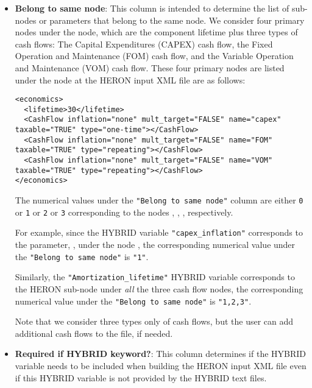 \begin{itemize}
    \item \textbf{Belong to same node}: This column is intended to determine the list of sub-nodes or parameters that belong to the same node. We consider four primary nodes under the  node, which are the component lifetime plus three types of cash flows: The Capital Expenditures (CAPEX) cash flow, the Fixed Operation and Maintenance (FOM) cash flow, and the Variable Operation and Maintenance (VOM) cash flow. These four primary nodes are listed under the  node at the HERON input XML file are as follows:
    
\begin{minipage}{0.93\textwidth}
\begin{lstlisting}[style=XML,morekeywords={class}]
<economics>
  <lifetime>30</lifetime>
  <CashFlow inflation="none" mult_target="FALSE" name="capex" taxable="TRUE" type="one-time"></CashFlow>
  <CashFlow inflation="none" mult_target="FALSE" name="FOM" taxable="TRUE" type="repeating"></CashFlow>
  <CashFlow inflation="none" mult_target="FALSE" name="VOM" taxable="TRUE" type="repeating"></CashFlow>
</economics>
\end{lstlisting}
\end{minipage} \par

The numerical values under the \verb|"Belong to same node"| column are either \verb|0| or \verb|1| or \verb|2| or \verb|3| corresponding to the nodes , , ,  respectively. 

For example, since the HYBRID variable \verb|"capex_inflation"| corresponds to the parameter, , under the node , the corresponding numerical value under the \verb|"Belong to same node"| is \verb|"1"|. 

Similarly, the \verb|"Amortization_lifetime"| HYBRID variable corresponds to the HERON sub-node  under \emph{all} the three cash flow nodes, the corresponding numerical value under the \verb|"Belong to same node"| is \verb|"1,2,3"|. 

Note that we consider three types only of cash flows, but the user can add additional cash flows to the  file, if needed. 
     
 \item \textbf{Required if HYBRID keyword?}: This column determines if the HYBRID variable needs to be included when building the HERON input XML file even if this HYBRID variable is not provided by the HYBRID text files. 
 

\end{itemize}
